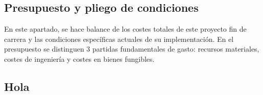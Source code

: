 \clearpage
{}%
\begin{center}
\begin{minipage}{.75\textwidth}
\section{Presupuesto y pliego de condiciones}

En este apartado, se hace balance de los costes totales de este proyecto fin de carrera y las condiciones específicas actuales de su implementación. En el presupuesto se distinguen 3 partidas fundamentales de gasto: recursos materiales, costes de ingeniería y costes en bienes fungibles.%
\end{minipage}
\end{center}
\clearpage%

\subsection{Hola}